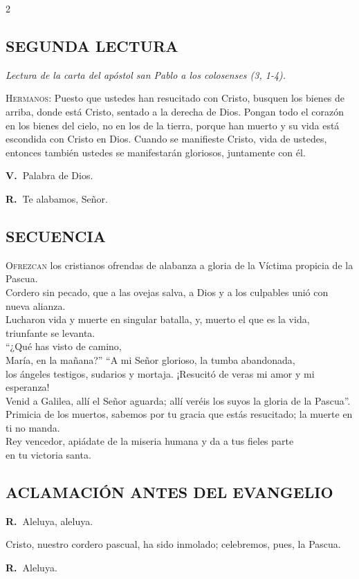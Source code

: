\documentclass[11pt, letterpaper, twoside]{article}
\newcommand{\rubrica}[1]{\textcolor{rubricred}{\small\textit{#1}}}
\newcommand{\vers}{\textcolor{rubricred}{\textbf{V.\ }}}
\newcommand{\resp}{\textcolor{rubricred}{\textbf{R.\ }}}
\begin{document}
\begin{multicols}{2}
\subsection*{SEGUNDA LECTURA}
\noindent\rubrica{Lectura de la carta del apóstol san Pablo a los colosenses (3, 1-4).} \par\vspace{0.2cm}
\lettrine{H}{ermanos:} Puesto que ustedes han resucitado con Cristo, busquen los bienes de arriba, donde está Cristo, sentado a la derecha de Dios. Pongan todo el corazón en los bienes del cielo, no en los de la tierra, porque han muerto y su vida está escondida con Cristo en Dios. Cuando se manifieste Cristo, vida de ustedes, entonces también ustedes se manifestarán gloriosos, juntamente con él. \par\vspace{0.2cm}
\vers Palabra de Dios. \par
\resp Te alabamos, Señor.

\subsection*{SECUENCIA}
\lettrine{O}{frezcan} los cristianos ofrendas de alabanza a gloria de la Víctima propicia de la Pascua. \\ 
Cordero sin pecado, que a las ovejas salva, a Dios y a los culpables unió con nueva alianza. \\ 
Lucharon vida y muerte en singular batalla, y, muerto el que es la vida, triunfante se levanta. \\ 
“¿Qué has visto de camino, \\ 
María, en la mañana?” “A mi Señor glorioso, la tumba abandonada, \\ 
los ángeles testigos, sudarios y mortaja. ¡Resucitó de veras mi amor y mi esperanza! \\ 
Venid a Galilea, allí el Señor aguarda; allí veréis los suyos la gloria de la Pascua”. \\ 
Primicia de los muertos, sabemos por tu gracia que estás resucitado; la muerte en ti no manda. \\ 
Rey vencedor, apiádate de la miseria humana y da a tus fieles parte \\ 
en tu victoria santa. \par\vspace{0.3cm}

\subsection*{ACLAMACIÓN ANTES DEL EVANGELIO}
\resp Aleluya, aleluya. \par
Cristo, nuestro cordero pascual, ha sido inmolado; celebremos, pues, la Pascua. \par
\resp Aleluya. \par\vspace{0.3cm}


\end{multicols}
\end{document}
